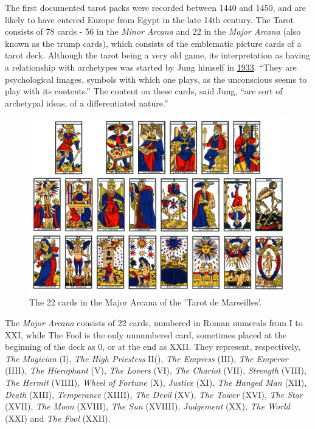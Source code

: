 \documentclass[
]{book}
\begin{document}
The first documented tarot packs were recorded between 1440 and 1450, and are likely to have entered Europe from Egypt in the late 14th century. The Tarot consists of 78 cards - 56 in the \emph{Minor Arcana} and 22 in the \emph{Major Arcana} (also known as the trump cards), which consists of the emblematic picture cards of a tarot deck. Although the tarot being a very old game, its interpretation as having a relationship with archetypes was started by Jung himself in \href{https://marykgreer.com/2008/03/31/carl-jung-and-tarot/}{1933}. ``They are psychological images, symbols with which one plays, as the unconscious seems to play with its contents.'' The content on these cards, said Jung, ``are sort of archetypal ideas, of a differentiated nature.''

\begin{figure}

{\centering \includegraphics[width=\textwidth]{img/tarot} 

}

\caption{The 22 cards in the Major Arcana of the 'Tarot de Marseilles'.}\label{fig:unnamed-chunk-8}
\end{figure}

The \emph{Major Arcana} consists of 22 cards, numbered in Roman numerals from I to XXI, while The Fool is the only unnumbered card, sometimes placed at the beginning of the deck as 0, or at the end as XXII. They represent, respectively, \emph{The Magician} (I), \emph{The High Priestess} II(), \emph{The Empress} (III), \emph{The Emperor} (IIII), \emph{The Hierophant} (V), \emph{The Lovers} (VI), \emph{The Chariot} (VII), \emph{Strength} (VIII), \emph{The Hermit} (VIIII), \emph{Wheel of Fortune} (X), \emph{Justice} (XI), \emph{The Hanged Man} (XII), \emph{Death} (XIII), \emph{Temperance} (XIIII), \emph{The Devil} (XV), \emph{The Tower} (XVI), \emph{The Star} (XVII), \emph{The Moon} (XVIII), \emph{The Sun} (XVIIII), \emph{Judgement} (XX), \emph{The World} (XXI) and \emph{The Fool} (XXII).
\end{document}

